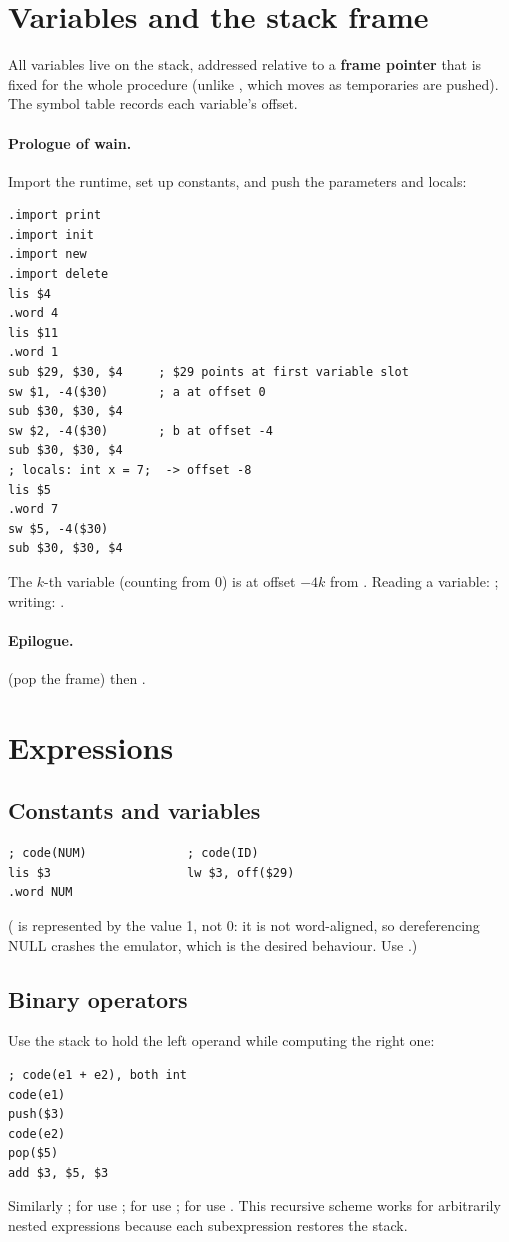 \section{Variables and the stack frame}

All variables live on the stack, addressed relative to a \textbf{frame pointer} 
that is fixed for the whole procedure (unlike , which moves as temporaries are
pushed). The symbol table records each variable's offset.

\paragraph{Prologue of wain.} Import the runtime, set up constants, and push the parameters and locals:
\begin{lstlisting}[style=mips]
.import print
.import init
.import new
.import delete
lis $4
.word 4
lis $11
.word 1
sub $29, $30, $4     ; $29 points at first variable slot
sw $1, -4($30)       ; a at offset 0
sub $30, $30, $4
sw $2, -4($30)       ; b at offset -4
sub $30, $30, $4
; locals: int x = 7;  -> offset -8
lis $5
.word 7
sw $5, -4($30)
sub $30, $30, $4
\end{lstlisting}
The $k$-th variable (counting from 0) is at offset $-4k$ from .
Reading a variable: ; writing: .
\paragraph{Epilogue.}  (pop the frame) then .

\section{Expressions}

\subsection{Constants and variables}
\begin{lstlisting}[style=mips]
; code(NUM)              ; code(ID)
lis $3                   lw $3, off($29)
.word NUM
\end{lstlisting}
( is represented by the value 1, not 0: it is not word-aligned, so dereferencing
NULL crashes the emulator, which is the desired behaviour. Use .)

\subsection{Binary operators}
Use the stack to hold the left operand while computing the right one:
\begin{lstlisting}[style=mips]
; code(e1 + e2), both int
code(e1)
push($3)
code(e2)
pop($5)
add $3, $5, $3
\end{lstlisting}
Similarly ; for \code{*} use ; for \code{/} use
; for \code{\%} use . This recursive scheme works
for arbitrarily nested expressions because each subexpression restores the stack.

